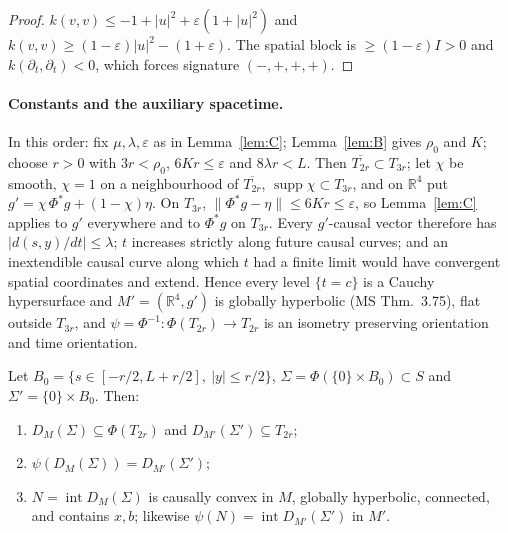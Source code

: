 \begin{proof}
$k(v,v)\le-1+|u|^2+\varepsilon(1+|u|^2)$ and $k(v,v)\ge(1-\varepsilon)|u|^2-
(1+\varepsilon)$. The spatial block is $\ge(1-\varepsilon)I>0$ and
$k(\partial_t,\partial_t)<0$, which forces signature $(-,+,+,+)$.
\end{proof}

\paragraph{Constants and the auxiliary spacetime.} In this order: fix
$\mu,\lambda,\varepsilon$ as in Lemma~\ref{lem:C}; Lemma~\ref{lem:B} gives
$\rho_0$ and $K$; choose $r>0$ with $3r<\rho_0$, $6Kr\le\varepsilon$ and
$8\lambda r<L$. Then $\overline{T_{2r}}\subset T_{3r}$; let $\chi$ be smooth,
$\chi=1$ on a neighbourhood of $\overline{T_{2r}}$,
$\operatorname{supp}\chi\subset T_{3r}$, and on
$\mathbb R^4$ put $g'=\chi\,\Phi^*g+(1-\chi)\eta$. On $T_{3r}$,
$\|\Phi^*g-\eta\|\le6Kr\le\varepsilon$, so Lemma~\ref{lem:C} applies to $g'$
everywhere and to $\Phi^*g$ on $T_{3r}$. Every $g'$-causal vector therefore
has $|d(s,y)/dt|\le\lambda$; $t$ increases strictly along future causal
curves; and an inextendible causal curve along which $t$ had a finite limit
would have convergent spatial coordinates and extend. Hence every level
$\{t=c\}$ is a Cauchy hypersurface and $M'=(\mathbb R^4,g')$ is globally
hyperbolic (MS Thm.~3.75), flat outside $T_{3r}$, and
$\psi=\Phi^{-1}:\Phi(T_{2r})\to T_{2r}$ is an isometry preserving orientation
and time orientation.

\begin{lemma}\label{lem:D}
Let $B_0=\{s\in[-r/2,L+r/2],\ |y|\le r/2\}$, $\Sigma=\Phi(\{0\}\times B_0)\subset
S$ and $\Sigma'=\{0\}\times B_0$. Then:
\begin{enumerate}
\item[(i)] $D_M(\Sigma)\subseteq\Phi(T_{2r})$ and $D_{M'}(\Sigma')\subseteq T_{2r}$;
\item[(ii)] $\psi(D_M(\Sigma))=D_{M'}(\Sigma')$;
\item[(iii)] $N=\operatorname{int}D_M(\Sigma)$ is causally convex in $M$,
globally hyperbolic, connected, and contains $x,b$; likewise
$\psi(N)=\operatorname{int}D_{M'}(\Sigma')$ in $M'$.
\end{enumerate}
\end{lemma}

